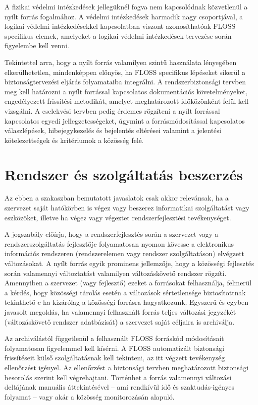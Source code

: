 \documentclass[12pt,magyar,a4paper,oneside]{scrreprt}
\begin{document}
A fizikai védelmi intézkedések jellegüknél fogva nem kapcsolódnak
közvetlenül a nyílt forrás fogalmához. A védelmi intézkedések harmadik
nagy csoportjával, a logikai védelmi intézkedésekkel kapcsolatban
viszont azonosíthatóak FLOSS specifikus elemek, amelyeket a logikai
védelmi intézkedések tervezése során figyelembe kell venni.

Tekintettel arra, hogy a nyílt forrás valamilyen szintű használata
lényegében elkerülhetetlen, mindenképpen előnyös, ha FLOSS specifikus
lépéseket sikerül a biztonságtervezési eljárás folyamataiba integrálni.
A rendszerbiztonsági tervben meg kell határozni a nyílt forrással
kapcsolatos dokumentációs követelményeket, engedélyezett frissítési
metodikát, amelyet meghatározott időközönként felül kell vizsgálni. A
cselekvési tervben pedig érdemes rögzíteni a nyílt forrással kapcsolatos
egyedi jellegzetességeket, úgymint a forrásmódosítással kapcsolatos
válaszlépések, hibejegykezelés és bejelentés eltérései valamint a
jelentési kötelezettségek és kritériumok a közösség felé.

\hypertarget{rendszer-uxe9s-szolguxe1ltatuxe1s-beszerzuxe9s-1}{%
\section{Rendszer és szolgáltatás
beszerzés}\label{rendszer-uxe9s-szolguxe1ltatuxe1s-beszerzuxe9s-1}}

Az ebben a szakaszban bemutatott javaslatok csak akkor relevánsak, ha a
szervezet saját hatókörben is végez vagy beszerez informatikai
szolgáltatást vagy eszközöket, illetve ha végez vagy végeztet
rendszerfejlesztési tevékenységet.

A jogszabály előírja, hogy a rendszerfejlesztés során a szervezet vagy a
rendszerszolgáltatás fejlesztője folyamatosan nyomon kövesse a
elektronikus információs rendszeren (rendszerelemen vagy rendszer
szolgáltatáson) elvégzett változásokat. A nyílt forrás egyik prominens
jellemzője, hogy a közösségi fejlesztés során valamennyi változtatást
valamilyen változáskövető rendszer rögzíti. Amennyiben a szervezet (vagy
fejlesztő) ezeket a forrásokat felhasználja, felmerül a kérdés, hogy
közösségi tárolás esetén a változások sértetlensége biztosítottnak
tekinthető-e ha kizárólag a közösségi forrásra hagyatkozunk. Egyszerű és
egyben javasolt megoldás, ha valamennyi felhasznált forrás teljes
változási jegyzékét (változáskövető rendszer adatbázisát) a szervezet
saját céljaira is archiválja.

Az archiválástól függetlenül a felhasznált FLOSS forráskód módosításait
folyamatosan figyelemmel kell kísérni. A FLOSS automatizált biztonsági
frissítéseit külső szolgáltatásnak kell tekinteni, az itt végzett
tevékenység ellenőrzést igényel. Az ellenőrzést a biztonsági tervben
meghatározott biztonsági besorolás szerint kell végrehajtani. Történhet
a forrás valamennyi változási deltájának manuális áttekintésével -- ami
rendkívül idő és szaktudás-igényes folyamat -- vagy akár a közösség
monitorozásán alapuló.
\end{document}
